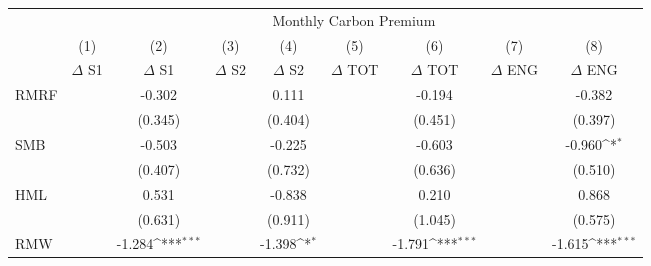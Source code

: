 {
\def\sym#1{\ifmmode^{#1}\else\(^{#1}\)\fi}
\begin{tabular}{l*{8}{c}}
\hline\hline
                    &\multicolumn{8}{c}{Monthly Carbon Premium}                                                                                                                                     \\\cmidrule(lr){2-9}
                    &\multicolumn{1}{c}{(1)}&\multicolumn{1}{c}{(2)}&\multicolumn{1}{c}{(3)}&\multicolumn{1}{c}{(4)}&\multicolumn{1}{c}{(5)}&\multicolumn{1}{c}{(6)}&\multicolumn{1}{c}{(7)}&\multicolumn{1}{c}{(8)}\\
                    &\multicolumn{1}{c}{$\Delta$ S1}&\multicolumn{1}{c}{$\Delta$ S1}&\multicolumn{1}{c}{$\Delta$ S2}&\multicolumn{1}{c}{$\Delta$ S2}&\multicolumn{1}{c}{$\Delta$ TOT}&\multicolumn{1}{c}{$\Delta$ TOT}&\multicolumn{1}{c}{$\Delta$ ENG}&\multicolumn{1}{c}{$\Delta$ ENG}\\
\hline
RMRF                &                     &      -0.302         &                     &       0.111         &                     &      -0.194         &                     &      -0.382         \\
                    &                     &     (0.345)         &                     &     (0.404)         &                     &     (0.451)         &                     &     (0.397)         \\
SMB                 &                     &      -0.503         &                     &      -0.225         &                     &      -0.603         &                     &      -0.960\sym{*}  \\
                    &                     &     (0.407)         &                     &     (0.732)         &                     &     (0.636)         &                     &     (0.510)         \\
HML                 &                     &       0.531         &                     &      -0.838         &                     &       0.210         &                     &       0.868         \\
                    &                     &     (0.631)         &                     &     (0.911)         &                     &     (1.045)         &                     &     (0.575)         \\
RMW                 &                     &      -1.284\sym{***}&                     &      -1.398\sym{*}  &                     &      -1.791\sym{***}&                     &      -1.615\sym{***}\\

\end{tabular}}
